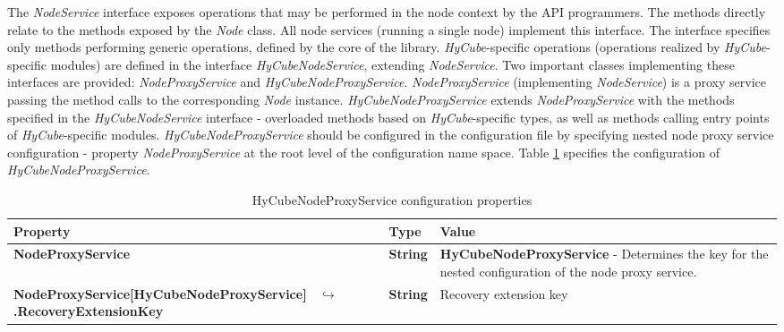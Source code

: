 The \emph{NodeService} interface exposes operations that may be performed in the node context by the API programmers. The methods directly relate to the methods exposed by the \emph{Node} class. All node services (running a single node) implement this interface. The interface specifies only methods performing generic operations, defined by the core of the library. \emph{HyCube}-specific operations (operations realized by \emph{HyCube}-specific modules) are defined in the interface \emph{HyCubeNodeService}, extending \emph{NodeService}. Two important classes implementing these interfaces are provided: \emph{NodeProxyService} and \emph{HyCubeNodeProxyService}. \emph{NodeProxyService} (implementing \emph{NodeService}) is a proxy service passing the method calls to the corresponding \emph{Node} instance. \emph{HyCubeNodeProxyService} extends \emph{NodeProxyService} with the methods specified in the \emph{HyCubeNodeService} interface - overloaded methods based on \emph{HyCube}-specific types, as well as methods calling entry points of \emph{HyCube}-specific modules. \emph{HyCubeNodeProxyService} should be configured in the configuration file by specifying nested node proxy service configuration - property \emph{NodeProxyService} at the root level of the configuration name space. Table \ref{tab:libHyCubeNodeProxyService} specifies the configuration of \emph{HyCubeNodeProxyService}.

\begin{table}
\scriptsize
\begin{center}
\begin{tabular}{p{6.0cm} p{1.0cm} p{7.5cm}}
	\hline
	\textbf{Property}							& \textbf{Type}						& \textbf{Value}					\\[1mm]
    \hline
	\textbf{NodeProxyService}					& \textbf{String}					& \textbf{HyCubeNodeProxyService} - Determines the key for the nested configuration of the node proxy service.		\\[1.5mm]	
	\textbf{NodeProxyService[HyCubeNodeProxyService] \newline \ $\hookrightarrow$.RecoveryExtensionKey}			& \textbf{String}		& Recovery extension key		\\[1.5mm]	
    \hline
\end{tabular}
\end{center}
\caption{HyCubeNodeProxyService configuration properties}
\label{tab:libHyCubeNodeProxyService}
\end{table}


